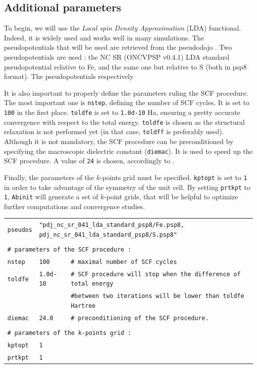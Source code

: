\documentclass[11pt,a4paper]{article}
\begin{document}
\subsection{Additional parameters}
To begin, we will use the \textit{Local spin Density Approximation} (LDA) functional. Indeed, it is widely used and works well in many simulations. The pseudopotentials that will be used are retrieved from the pseudodojo \cite{PseudoDojo}. Two pseudopotentials are used : the NC SR (ONCVPSP v0.4.1) LDA standard pseudopotential relative to Fe, and the same one but relative to S (both in psp8 format). The pseudopotentials respectively 

It is also important to properly define the parameters ruling the SCF procedure. The most important one is \texttt{nstep}, defining the number of SCF cycles. It is set to \texttt{100} in the first place. \texttt{toldfe} is set to \texttt{1.0d-10} Ha, ensuring a pretty accurate convergence with respect to the total energy. \texttt{toldfe} is chosen as the structural relaxation is not performed yet (in that case, \texttt{toldff} is preferably used). Although it is not mandatory, the SCF procedure can be preconditioned by specifying the macroscopic dielectric constant (\texttt{diemac}). It is used to speed up the SCF procedure. A value of \texttt{24} is chosen, accordingly to \cite{MaterialsProject}. 

Finally, the parameters of the $k$-points grid must be specified. \texttt{kptopt} is set to \texttt{1} in order to take advantage of the symmetry of the unit cell. 
By setting \texttt{prtkpt} to \texttt{1}, \texttt{Abinit} will generate a set of $k$-point grids, that will be helpful to optimize further computations and convergence studies.
\begin{center}
\begin{tabular}{lll}
\texttt{pseudos} & \multicolumn{2}{l}{\texttt{"pdj\_nc\_sr\_041\_lda\_standard\_psp8/Fe.psp8, pdj\_nc\_sr\_041\_lda\_standard\_psp8/S.psp8"}}\\
&&\\
\multicolumn{3}{l}{\texttt{\# parameters of the SCF procedure : }}\\
\texttt{nstep} & \texttt{100} &\texttt{\# maximal number of SCF cycles}\\
\texttt{toldfe} & \texttt{1.0d-10} &\texttt{\# SCF procedure will stop when the difference of total energy}\\
&&\texttt{\#\space\space\space\space between two iterations will be lower than toldfe Hartree}\\
\texttt{diemac} &\texttt{24.0} & \texttt{\# preconditioning of the SCF procedure.}\\
&&\\
\multicolumn{3}{l}{\texttt{\# parameters of the k-points grid : }}\\
\texttt{kptopt} & \texttt{1} &\\
\texttt{prtkpt} & \texttt{1} 
\end{tabular}
\end{center}
\end{document}

